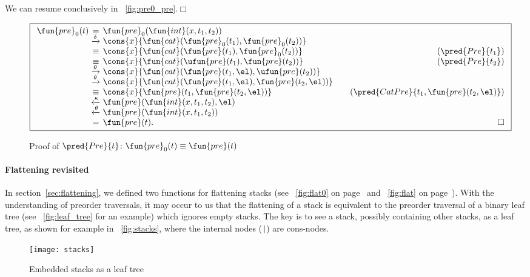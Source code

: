 We can resume conclusively in \fig~\vref{fig:pre0_pre}.\hfill\(\Box\)
\begin{figure}[!b]
\begin{equation*}
\boxed{%
\begin{array}{r@{\;}c@{\;}l@{\qquad}r}
\fun{pre}_0(t)
& = & \fun{pre}_0(\fun{int}(x,t_1,t_2))\\
& \xrightarrow{\smash{\delta}}
& \cons{x}{\fun{cat}(\fun{pre}_0(t_1), \fun{pre}_0(t_2))}\\
& \equiv & \cons{x}{\fun{cat}(\fun{pre}(t_1), \fun{pre}_0(t_2))}
& (\pred{Pre}{t_1})\\
& \equiv & \cons{x}{\fun{cat}(\ufun{pre}(t_1), \fun{pre}(t_2))}
& (\pred{Pre}{t_2})\\
& \xrightarrow{\smash{\theta}}
& \cons{x}{\fun{cat}(\fun{pre}(t_1,\el), \ufun{pre}(t_2))}\\
& \xrightarrow{\smash{\theta}}
& \cons{x}{\fun{cat}(\fun{pre}(t_1,\el), \fun{pre}(t_2,\el))}\\
& \equiv
& \cons{x}{\fun{pre}(t_1,\fun{pre}(t_2,\el))}
& (\pred{CatPre}{t_1,\fun{pre}(t_2,\el)})\\
& \xleftarrow{\smash{\kappa}}
& \fun{pre}(\fun{int}(x,t_1,t_2),\el)\\
& \xleftarrow{\smash{\theta}}
& \fun{pre}(\fun{int}(x,t_1,t_2))\\
& = & \fun{pre}(t). & \hfill\Box
\end{array}}
\end{equation*}
\caption{Proof of \(\pred{Pre}{t} \colon \fun{pre}_0(t) \equiv
  \fun{pre}(t)\)}
\label{fig:pre0_pre}
\end{figure}

\paragraph{Flattening revisited}

In section~\vref{sec:flattening}, we defined two functions for
flattening stacks (see \fig~\ref{fig:flat0} on
page~\pageref{fig:flat0} and \fig~\ref{fig:flat} on
page~\pageref{fig:flat}). With the understanding of preorder
traversals, it may occur to us that the flattening of a stack is
equivalent to the preorder traversal of a binary leaf
tree (see \fig~\vref{fig:leaf_tree} for
an example) which ignores empty stacks. The key is to see a stack,
possibly containing other stacks, as a leaf tree, as shown for example
in \fig~\vref{fig:stacks}, where the internal nodes (\texttt{|}) are
cons\hyp{}nodes.
\begin{figure}
\centering
\texttt{[image: stacks]}
\caption{Embedded stacks as a leaf tree}
\label{fig:stacks}
\end{figure}

